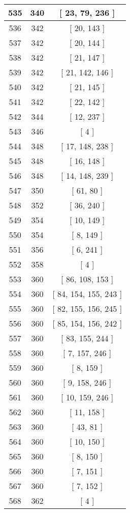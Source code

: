 \begin{center}
\begin{longtable}[H]{|| c c c ||}
\hline
535 & 340 & [ 23, 79, 236 ] \\ 
\hline
536 & 342 & [ 20, 143 ] \\ 
\hline
537 & 342 & [ 20, 144 ] \\ 
\hline
538 & 342 & [ 21, 147 ] \\ 
\hline
539 & 342 & [ 21, 142, 146 ] \\ 
\hline
540 & 342 & [ 21, 145 ] \\ 
\hline
541 & 342 & [ 22, 142 ] \\ 
\hline
542 & 344 & [ 12, 237 ] \\ 
\hline
543 & 346 & [ 4 ] \\ 
\hline
544 & 348 & [ 17, 148, 238 ] \\ 
\hline
545 & 348 & [ 16, 148 ] \\ 
\hline
546 & 348 & [ 14, 148, 239 ] \\ 
\hline
547 & 350 & [ 61, 80 ] \\ 
\hline
548 & 352 & [ 36, 240 ] \\ 
\hline
549 & 354 & [ 10, 149 ] \\ 
\hline
550 & 354 & [ 8, 149 ] \\ 
\hline
551 & 356 & [ 6, 241 ] \\ 
\hline
552 & 358 & [ 4 ] \\ 
\hline
553 & 360 & [ 86, 108, 153 ] \\ 
\hline
554 & 360 & [ 84, 154, 155, 243 ] \\ 
\hline
555 & 360 & [ 82, 155, 156, 245 ] \\ 
\hline
556 & 360 & [ 85, 154, 156, 242 ] \\ 
\hline
557 & 360 & [ 83, 155, 244 ] \\ 
\hline
558 & 360 & [ 7, 157, 246 ] \\ 
\hline
559 & 360 & [ 8, 159 ] \\ 
\hline
560 & 360 & [ 9, 158, 246 ] \\ 
\hline
561 & 360 & [ 10, 159, 246 ] \\ 
\hline
562 & 360 & [ 11, 158 ] \\ 
\hline
563 & 360 & [ 43, 81 ] \\ 
\hline
564 & 360 & [ 10, 150 ] \\ 
\hline
565 & 360 & [ 8, 150 ] \\ 
\hline
566 & 360 & [ 7, 151 ] \\ 
\hline
567 & 360 & [ 7, 152 ] \\ 
\hline
568 & 362 & [ 4 ] \\ 
\hline

\end{longtable}
\end{center}
